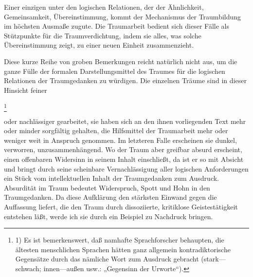 \documentclass[twoside=true,titlepage=false,open=any, parskip=never, fontsize=10pt, headings=small, chapterprefix=false, appendixprefix=false]{scrbook}
\begin{document}
            
        \pstart
        Einer einzigen unter den logischen Relationen, der der Ähnlichkeit, Gemeinsamkeit,
                  Übereinstimmung, kommt der Mechanismus der Traumbildung im höchsten
               Ausmaße zugute. Die Traumarbeit bedient sich dieser Fälle als Stützpunkte für
               die Traumverdichtung, indem sie alles, was solche Übereinstimmung zeigt, zu
               einer neuen Einheit zusammenzieht.
        \pend
    
            
        \pstart
        Diese kurze Reihe von groben Bemerkungen reicht natürlich nicht aus, um die
               ganze Fülle der formalen Darstellungsmittel des Traumes für die logischen
               Relationen der Traumgedanken zu würdigen. Die einzelnen Träume sind in dieser
               Hinsicht feiner
        \pend
    
            
        \footnote{1) Es ist bemerkenswert, daß
               namhafte Sprachforscher behaupten, die ältesten menschlichen Sprachen hätten
               ganz allgemein kontradiktorische Gegensätze durch das nämliche Wort zum Ausdruck
               gebracht (stark—schwach; innen—außen usw.: „Gegensinn der Urworte“).}
    
         
            
            
            
        \pstart
        oder nachlässiger gearbeitet, sie haben sich an den ihnen vorliegenden Text mehr oder minder sorgfältig gehalten, die Hilfsmittel der Traumarbeit mehr oder weniger weit in Anspruch
               genommen. Im letzteren Falle erscheinen sie dunkel, verworren,
               unzusammenhängend. Wo der Traum aber greifbar absurd erscheint, einen offenbaren
               Widersinn in seinem Inhalt einschließt, da ist er so mit Absicht und bringt
               durch seine scheinbare Vernachlässigung aller logischen Anforderungen
               ein Stück vom intellektuellen Inhalt der Traumgedanken zum Ausdruck.
               Absurdität im Traum bedeutet Widerspruch, Spott und Hohn in
               den Traumgedanken. Da diese Aufklärung den stärksten Einwand gegen die
               Auffassung liefert, die den Traum durch dissoziierte, kritiklose
               Geistestätigkeit entstehen läßt, werde ich sie durch ein Beispiel zu Nachdruck
               bringen.
        \pend
    
\end{document}
